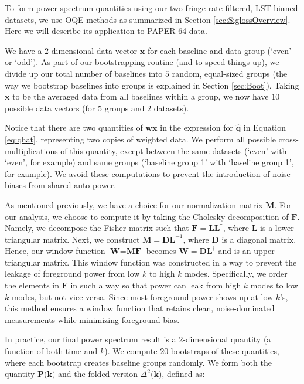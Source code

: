 \documentclass[preprint2,numberedappendix,tighten,twocolappendix]{aastex6}  %
\begin{document}
To form power spectrum quantities using our two fringe-rate filtered, LST-binned datasets, we use OQE methods as summarized in Section \ref{sec:SiglossOverview}. Here we will describe its application to PAPER-64 data. 

We have a $2$-dimensional data vector $\textbf{x}$ for each baseline and data group (`even' or `odd'). As part of our bootstrapping routine (and to speed things up), we divide up our total number of baselines into $5$ random, equal-sized groups (the way we bootstrap baselines into groups is explained in Section \ref{sec:Boot}). Taking $\textbf{x}$ to be the averaged data from all baselines within a group, we now have $10$ possible data vectors (for $5$ groups and $2$ datasets). 

Notice that there are two quantities of $\textbf{w}\textbf{x}$ in the expression for $\hat{\textbf{q}}$ in Equation \ref{eq:qhat}, representing two copies of weighted data. We perform all possible cross-multiplications of this quantity, except between the same datasets (`even' with `even', for example) and same groups (`baseline group 1' with `baseline group 1', for example). We avoid these computations to prevent the introduction of noise biases from shared auto power.

As mentioned previously, we have a choice for our normalization matrix $\textbf{M}$. For our analysis, we choose to compute it by taking the Cholesky decomposition of $\textbf{F}$. Namely, we decompose the Fisher matrix such that $\textbf{F} = \textbf{L}\textbf{L}^{\dagger}$, where $\textbf{L}$ is a lower triangular matrix. Next, we construct $\textbf{M} = \textbf{D}\textbf{L}^{-1}$, where \textbf{D} is a diagonal matrix. Hence, our window function $\textbf{W} = \textbf{MF}$ becomes $\textbf{W} = \textbf{D}\textbf{L}^{\dagger}$ and is an upper triangular matrix. This window function was constructed in a way to prevent the leakage of foreground power from low $k$ to high $k$ modes. Specifically, we order the elements in $\textbf{F}$ in such a way so that power can leak from high $k$ modes to low $k$ modes, but not vice versa. Since most foreground power shows up at low $k$'s, this method ensures a window function that retains clean, noise-dominated measurements while minimizing foreground bias. 

In practice, our final power spectrum result is a $2$-dimensional quantity (a function of both time and $k$). We compute $20$ bootstraps of these quantities, where each bootstrap creates baseline groups randomly. We form both the quantity $\textbf{P(k)}$ and the folded version $\Delta^{2}\textbf{(k)}$, defined as:
\end{document}
